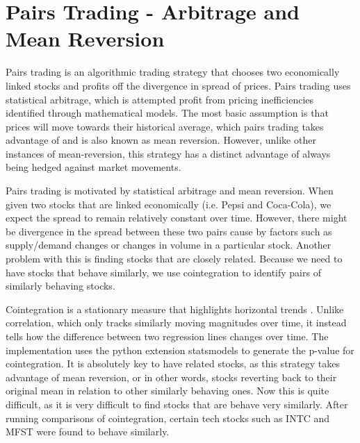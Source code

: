 \documentclass[../thesis.tex]{subfiles}
\begin{document}
\section{Pairs Trading - Arbitrage and Mean Reversion}

Pairs trading is an algorithmic trading strategy that chooses two economically linked stocks and profits off the divergence in spread of prices. Pairs trading uses statistical arbitrage, which is attempted profit from pricing inefficiencies identified through mathematical models. The most basic assumption is that prices will move towards their historical average, which pairs trading takes advantage of and is also known as mean reversion.  However, unlike other instances of mean-reversion, this strategy has a distinct advantage of always being hedged against market movements. 

Pairs trading is motivated by statistical arbitrage and mean reversion\cite{Fu2009}. When given two stocks that are linked economically (i.e. Pepsi and Coca-Cola), we expect the spread to remain relatively constant over time. However, there might be divergence in the spread between these two pairs cause by factors such as supply/demand changes or changes in volume in a particular stock.  Another problem with this is finding stocks that are closely related. Because we need to have stocks that behave similarly, we use cointegration to identify pairs of similarly behaving stocks. 

Cointegration is a stationary measure that highlights horizontal trends \cite{Gatev2006}. Unlike correlation, which only tracks similarly moving magnitudes over time, it instead tells how the difference between two regression lines changes over time. The implementation uses the python extension statsmodels to generate the p-value for cointegration. It is absolutely key to have related stocks, as this strategy takes advantage of mean reversion, or in other words, stocks reverting back to their original mean in relation to other similarly behaving ones. Now this is quite difficult, as it is very difficult to find stocks that are behave very similarly. After running comparisons of cointegration, certain tech stocks such as INTC and MFST were found to behave similarly.  
\end{document}
